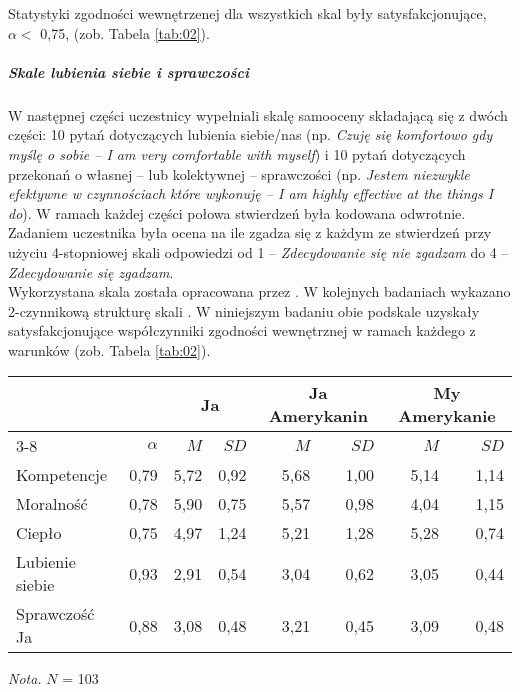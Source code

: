 \documentclass[man]{apa6}
\begin{document}
Statystyki zgodności wewnętrzenej dla wszystkich skal były satysfakcjonujące, $\alpha <$ 0,75, (zob. Tabela \ref{tab:02}). \\

\subparagraph{Skale lubienia siebie i sprawczości}
W następnej części uczestnicy wypełniali skalę samooceny składającą się z dwóch części: 10 pytań dotyczących lubienia siebie/nas (np. \emph{Czuję się komfortowo gdy myślę o sobie -- I am very comfortable with myself}) i 10 pytań dotyczących przekonań o własnej -- lub kolektywnej -- sprawczości (np. \emph{Jestem niezwykle efektywne w czynnościach które wykonuję -- I am highly effective at the things I do}). W ramach każdej części połowa stwierdzeń była kodowana odwrotnie. Zadaniem uczestnika była ocena na ile zgadza się z każdym ze stwierdzeń przy użyciu 4-stopniowej skali odpowiedzi od 1 -- \emph{Zdecydowanie się nie zgadzam} do 4 -- \emph{Zdecydowanie się zgadzam}.\\

Wykorzystana skala została opracowana przez \textcite{tafarodi1995self}. W kolejnych badaniach wykazano 2-czynnikową strukturę skali \parencite{tafarodi2002decomposing}. W niniejszym badaniu obie podskale uzyskały satysfakcjonujące współczynniki zgodności wewnętrznej w ramach każdego z warunków (zob. Tabela \ref{tab:02}).

\begin{table*}[htbp]
\vspace*{2em}
\centering
\begin{threeparttable}
\caption{Podstawowe statystyki opisowe dla skal użytych w Badaniu 2}
\label{tab:02}

\begin{tabular}{lrrrrrrr}

\midrule
\multicolumn{2}{c}{ } & \multicolumn{2}{c}{Ja} & \multicolumn{2}{c}{Ja Amerykanin} & \multicolumn{2}{c}{My Amerykanie} \\
\cline{3-8}
& $\alpha$ & $M$ & $SD$ & $M$ & $SD$ & $M$ & $SD$ \\
\midrule
Kompetencje & 0,79 & 5,72 & 0,92 & 5,68 & 1,00 & 5,14 & 1,14 \\
Moralność   & 0,78 & 5,90 & 0,75 & 5,57 & 0,98 & 4,04 & 1,15 \\
Ciepło      & 0,75 & 4,97 & 1,24 & 5,21 & 1,28 & 5,28 & 0,74 \\
Lubienie siebie & 0,93 & 2,91 & 0,54 & 3,04 & 0,62 & 3,05 & 0,44 \\
Sprawczość Ja   & 0,88 & 3,08 & 0,48 & 3,21 & 0,45 & 3,09 & 0,48 \\
\bottomrule

\end{tabular}

\begin{tablenotes}
{\small
\textit{Nota.} $N$ = 103
}
\end{tablenotes}
\end{threeparttable}
\end{table*}
\end{document}
